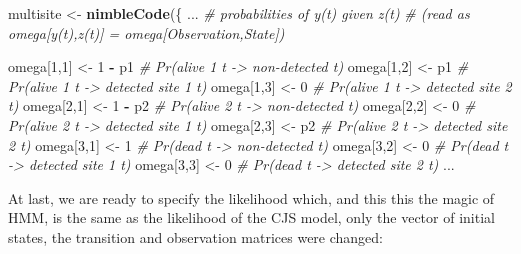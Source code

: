 \documentclass[
  12pt,
]{krantz}
\newenvironment{Shaded}{\begin{snugshade}}{\end{snugshade}}
\newcommand{\CommentTok}[1]{\textcolor[rgb]{0.56,0.35,0.01}{\textit{#1}}}
\newcommand{\DecValTok}[1]{\textcolor[rgb]{0.00,0.00,0.81}{#1}}
\newcommand{\FunctionTok}[1]{\textcolor[rgb]{0.13,0.29,0.53}{\textbf{#1}}}
\newcommand{\NormalTok}[1]{#1}
\newcommand{\OtherTok}[1]{\textcolor[rgb]{0.56,0.35,0.01}{#1}}
\newcommand{\SpecialCharTok}[1]{\textcolor[rgb]{0.81,0.36,0.00}{\textbf{#1}}}
\begin{document}
\begin{Shaded}
\begin{Highlighting}[]
\NormalTok{multisite }\OtherTok{\textless{}{-}} \FunctionTok{nimbleCode}\NormalTok{(\{}
\NormalTok{...}
  \CommentTok{\# probabilities of y(t) given z(t)}
  \CommentTok{\# (read as omega[y(t),z(t)] = omega[Observation,State])}

\NormalTok{  omega[}\DecValTok{1}\NormalTok{,}\DecValTok{1}\NormalTok{] }\OtherTok{\textless{}{-}} \DecValTok{1} \SpecialCharTok{{-}}\NormalTok{ p1     }\CommentTok{\# Pr(alive 1 t {-}\textgreater{} non{-}detected t)}
\NormalTok{  omega[}\DecValTok{1}\NormalTok{,}\DecValTok{2}\NormalTok{] }\OtherTok{\textless{}{-}}\NormalTok{ p1         }\CommentTok{\# Pr(alive 1 t {-}\textgreater{} detected site 1 t)}
\NormalTok{  omega[}\DecValTok{1}\NormalTok{,}\DecValTok{3}\NormalTok{] }\OtherTok{\textless{}{-}} \DecValTok{0}          \CommentTok{\# Pr(alive 1 t {-}\textgreater{} detected site 2 t)}
\NormalTok{  omega[}\DecValTok{2}\NormalTok{,}\DecValTok{1}\NormalTok{] }\OtherTok{\textless{}{-}} \DecValTok{1} \SpecialCharTok{{-}}\NormalTok{ p2     }\CommentTok{\# Pr(alive 2 t {-}\textgreater{} non{-}detected t)}
\NormalTok{  omega[}\DecValTok{2}\NormalTok{,}\DecValTok{2}\NormalTok{] }\OtherTok{\textless{}{-}} \DecValTok{0}          \CommentTok{\# Pr(alive 2 t {-}\textgreater{} detected site 1 t)}
\NormalTok{  omega[}\DecValTok{2}\NormalTok{,}\DecValTok{3}\NormalTok{] }\OtherTok{\textless{}{-}}\NormalTok{ p2         }\CommentTok{\# Pr(alive 2 t {-}\textgreater{} detected site 2 t)}
\NormalTok{  omega[}\DecValTok{3}\NormalTok{,}\DecValTok{1}\NormalTok{] }\OtherTok{\textless{}{-}} \DecValTok{1}          \CommentTok{\# Pr(dead t {-}\textgreater{} non{-}detected t)}
\NormalTok{  omega[}\DecValTok{3}\NormalTok{,}\DecValTok{2}\NormalTok{] }\OtherTok{\textless{}{-}} \DecValTok{0}          \CommentTok{\# Pr(dead t {-}\textgreater{} detected site 1 t)}
\NormalTok{  omega[}\DecValTok{3}\NormalTok{,}\DecValTok{3}\NormalTok{] }\OtherTok{\textless{}{-}} \DecValTok{0}          \CommentTok{\# Pr(dead t {-}\textgreater{} detected site 2 t)}
\NormalTok{...}
\end{Highlighting}
\end{Shaded}

At last, we are ready to specify the likelihood which, and this this the magic of HMM, is the same as the likelihood of the CJS model, only the vector of initial states, the transition and observation matrices were changed:
\end{document}

